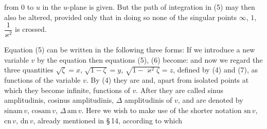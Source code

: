 from 0 to \(u\) in the \(u\)-plane is given. But the path of integration
in (5) may then also be altered, provided only that in doing so none of
the singular points \(\infty\), \(1\), \(\dfrac{1}{\varkappa^2}\) is crossed.

Equation (5) can be written in the following three forms:
If we introduce a new variable \(v\) by the equation
then equations (5), (6) become:
and now we regard the three quantities \(\sqrt{\zeta} = x\), \(\sqrt{1-\zeta} = y\),
\(\sqrt{1-\varkappa^2\zeta} = z\), defined by (4) and (7), as functions of the variable
\(v\). By (4) they are  and, apart from isolated
points at which they become infinite,  functions of \(v\). After
 they are called sinus amplitudinis, cosinus amplitudinis,
\(\varDelta\) amplitudinis of \(v\), and are denoted by \(\mathrm{sinam}\,v\),
\(\mathrm{cosam}\,v\), \(\varDelta\,\mathrm{am}\,v\). Here we wish to make use of the
shorter  notation \(\mathrm{sn}\,v\), \(\mathrm{cn}\,v\),
\(\mathrm{dn}\,v\), already mentioned in \S\,14, according to which
